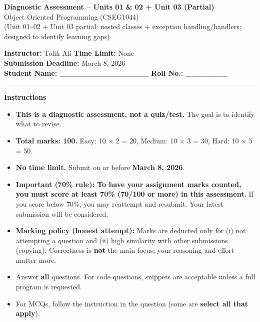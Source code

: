 \documentclass[11pt,a4paper]{article}
\newcommand{\SubmissionDeadline}{March 8, 2026}
\begin{document}
\begin{center}
  {\LARGE \textbf{Diagnostic Assessment -- Units 01 \& 02 + Unit 03 (Partial)}}\\[0.25em]
  {\large Object Oriented Programming (CSEG1044)}\\[0.25em]
  \normalsize (Unit 01--02 + Unit 03 partial: nested classes + exception handling/handlers; designed to identify learning gaps)
\end{center}

\noindent
\textbf{Instructor:} Tofik Ali \hfill \textbf{Time Limit:} None\\
\textbf{Submission Deadline:} \SubmissionDeadline\\
\textbf{Student Name:} \_\_\_\_\_\_\_\_\_\_\_\_\_\_\_\_\_ \hfill \textbf{Roll No.:} \_\_\_\_\_\_\_\_\\

\vspace{0.6em}
\hrule
\vspace{0.8em}

\textbf{Instructions}
\begin{itemize}[leftmargin=*]
  \item \textbf{This is a diagnostic assessment, not a quiz/test.} The goal is to identify what to revise.
  \item \textbf{Total marks: 100.} Easy: 10 $\times$ 2 = 20, Medium: 10 $\times$ 3 = 30, Hard: 10 $\times$ 5 = 50.
  \item \textbf{No time limit.} Submit on or before \textbf{\SubmissionDeadline}.
  \item \textbf{Important (70\% rule): To have your assignment marks counted, you must score at least 70\% (70/100 or more) in this assessment.}
    If you score below 70\%, you may reattempt and resubmit. Your latest submission will be considered.
  \item \textbf{Marking policy (honest attempt):} Marks are deducted only for (i) not attempting a question and (ii) high similarity with other submissions (copying).
    Correctness is \textbf{not} the main focus; your reasoning and effort matter more.
  \item Answer \textbf{all} questions. For code questions, snippets are acceptable unless a full program is requested.
  \item For MCQs, follow the instruction in the question (some are \textbf{select all that apply}).
\end{itemize}

\vspace{0.6em}
\end{document}

